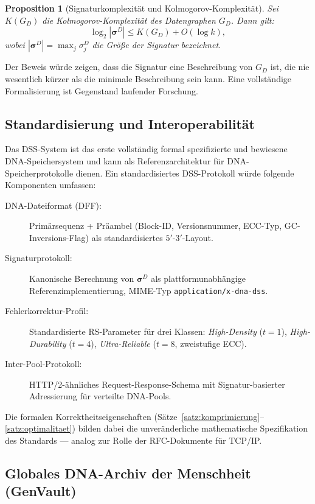 ﻿\documentclass[a4paper,12pt]{article}
\theoremstyle{definition}
\theoremstyle{plain}
\newtheorem{proposition}{Proposition}[section]
\begin{document}
\begin{proposition}[Signaturkomplexität und Kolmogorov-Komplexität]
\label{prop:kolmogorov}
  Sei $K(G_D)$ die Kolmogorov-Komplexität des Datengraphen $G_D$.
  Dann gilt:
  \[
    \log_2 |\boldsymbol{\sigma}^D| \le K(G_D) + O(\log k),
  \]
  wobei $|\boldsymbol{\sigma}^D| = \max_j \sigma_j^D$ die Größe der
  Signatur bezeichnet.
\end{proposition}

Der Beweis würde zeigen, dass die Signatur eine Beschreibung von $G_D$
ist, die nie wesentlich kürzer als die minimale Beschreibung sein kann.
Eine vollständige Formalisierung ist Gegenstand laufender Forschung.

\subsection{Standardisierung und Interoperabilität}
\label{ssec:standardisierung}

Das DSS-System ist das erste vollständig formal spezifizierte und bewiesene
DNA-Speicher\-system und kann als Referenzarchitektur für DNA-Speicherprotokolle
dienen.  Ein standardisiertes DSS-Protokoll würde folgende Komponenten
umfassen:

\begin{description}
  \item[DNA-Dateiformat (DFF):] Primärsequenz + Präambel (Block-ID,
        Versionsnummer, ECC-Typ, GC-Inversions-Flag) als standardisiertes
        $5'$-$3'$-Layout.
  \item[Signaturprotokoll:] Kanonische Berechnung von $\boldsymbol{\sigma}^D$
        als plattformunabhängige Referenzimplementierung, MIME-Typ
        \texttt{application/x-dna-dss}.
  \item[Fehlerkorrektur-Profil:] Standardisierte RS-Parameter für drei
        Klassen: \emph{High-Density} ($t=1$), \emph{High-Durability} ($t=4$),
        \emph{Ultra-Reliable} ($t=8$, zweistufige ECC).
  \item[Inter-Pool-Protokoll:] HTTP/2-ähnliches Request-Response-Schema
        mit Signatur-basier\-ter Adressierung für verteilte DNA-Pools.
\end{description}

Die formalen Korrektheitseigenschaften (Sätze~\ref{satz:komprimierung}--\ref{satz:optimalitaet})
bilden dabei die unveränderliche mathematische Spezifikation des Standards
--- analog zur Rolle der RFC-Dokumente für TCP/IP.

\subsection{Globales DNA-Archiv der Menschheit (GenVault)}
\label{ssec:genvault}
\end{document}
